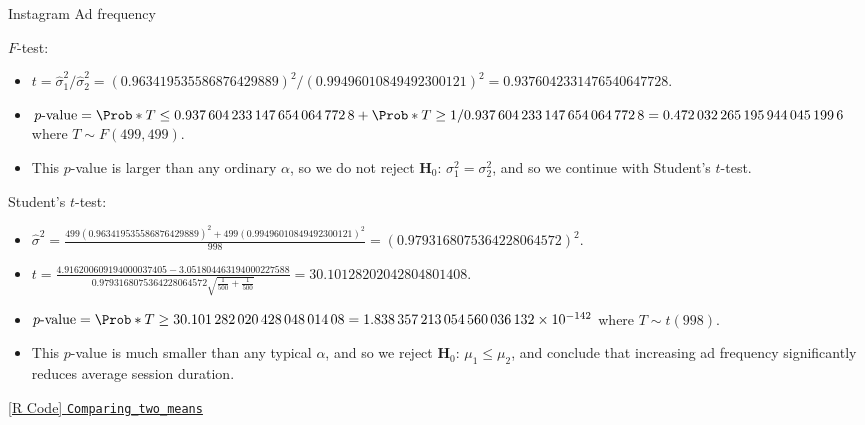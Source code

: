 \begin{Example}{Instagram Ad frequency}{}
\begin{framed}
        $ F $-test:
        \begin{itemize}
            \item $ t=\hat{\sigma}_1^2/\hat{\sigma}_2^2=(\num{0.963419535586876429889})^2/(\num{0.99496010849492300121})^2=\num{0.9376042331476540647728} $.
            \item $ p\text{-value}=\Prob*{T\le \num{0.9376042331476540647728}}+\Prob*{T\ge 1/\num{0.9376042331476540647728}}=\num{0.4720322651959440451996} $
                  where $ T \sim F(499,499) $.
            \item This $ p $-value is larger than any ordinary $ \alpha $, so
                  we do not reject $ \mathbf{H}_0 $: $ \sigma_1^2=\sigma_2^2 $, and so we continue
                  with Student's $ t $-test.
        \end{itemize}
    \end{framed}
    \begin{framed}
        Student's $ t $-test:
        \begin{itemize}
            \item $ \displaystyle \hat{\sigma}^2=\frac{499(\num{0.963419535586876429889})^2+499(\num{0.99496010849492300121})^2}{998}=(\num{0.9793168075364228064572})^2 $.
            \item $ \displaystyle t=\frac{\num{4.916200609194000037405}-\num{3.051804463194000227588}}{\num{0.9793168075364228064572}\sqrt{\frac{1}{500} +\frac{1}{500}}}=\num{30.10128202042804801408} $.
            \item $ p\text{-value}=\Prob*{T\ge \num{30.10128202042804801408}}=\num{1.838357213054560036132e-142} $ where $ T \sim t(998) $.
            \item This $ p $-value is much smaller than any typical $ \alpha $, and so we reject
                  $ \mathbf{H}_0 $: $ \mu_1\le \mu_2 $, and conclude that increasing ad frequency significantly
                  reduces average session duration.
        \end{itemize}
    \end{framed}
    \href{https://github.com/Hextical/university-notes/blob/master/year-3/semester-3/STAT 430/code/W2/Comparing_two_means.R}{[R Code] \texttt{Comparing\_two\_means}}
\end{Example}
